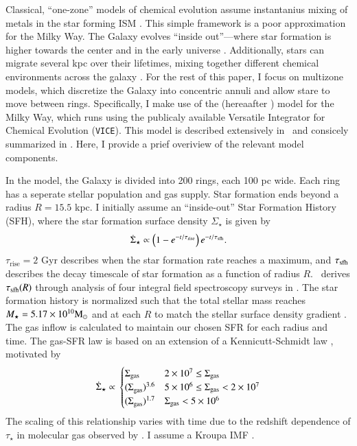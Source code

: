 \documentclass[12pt,oneside]{report}
\newcommand{\JJ}{\citetalias{james+21}}
\newcommand{\VICE}{\texttt{VICE}}
\begin{document}
Classical, ``one-zone'' models of chemical evolution assume instantanius mixing of metals in the star forming ISM \citep[e.g.][]{matteucci21}. This simple framework is a poor approximation for the Milky Way.  The Galaxy evolves ``inside out''---where star formation is higher towards the center and in the early universe \citep{bird+13}. Additionally, stars can migrate several kpc over their lifetimes, mixing together different chemical environments across the galaxy \citep{bird+12,sellwood+binney02}. For the rest of this paper, I focus on multizone models, which discretize the Galaxy into concentric annuli and allow stare to move between rings.  Specifically, I make use of the \citet{james+21} (hereaafter \JJ) model for the Milky Way, which runs using the publicaly available Versatile Integrator for Chemical Evolution (\VICE). This model is described extensively in \JJ~and consicely summarized  in \citet{james+22}. Here, I provide a prief overiview of the relevant model components.

In the model, the Galaxy is divided into 200 rings, each 100 pc wide. Each ring has a seperate stellar population and gas supply. Star formation ends beyond a radius $R=15.5$ kpc. I initially assume an ``inside-out'' Star Formation History (SFH), where the star formation surface density $\Sigma_\star$ is given by 
\begin{equation}
    \dot{\Sigma}_\star \propto \left(1-e^{-t/\tau_{\rm rise}}\right) e^{-t/\tau_{\rm sfh}}.
\end{equation}
$\tau_\text{rise}=2$ Gyr describes when the star formation rate reaches a maximum, and $\tau_{\rm sfh}$ describes the decay timescale of star formation as a function of radius $R$. \JJ~derives $\tau_{\rm sfh}(R)$ through analysis of four integral field spectroscopy surveys in \cite{sanches20}. The star formation history is normalized such that the total stellar mass reaches $M_\star=5.17\times10^{10} {\rm M}_\odot$ \citep{LM15} and at each $R$ to match the stellar surface density gradient \citep{BHG16}.
The gas inflow is calculated to maintain our chosen SFR for each radius and time. The gas-SFR law is based on an extension of a Kennicutt-Schmidt law \citep{kennicutt98}, motivated by 
\begin{equation}
\dot{\Sigma}_{\star} \propto \\
\begin{cases}
    {\Sigma}_{\rm gas} & 2\times 10^7 \leq \Sigma_{\rm gas} \\ 
    {(\Sigma}_{\rm gas})^{3.6} & 5\times 10^6 \leq \Sigma_{\rm gas} < 2\times10^7 \\ 
    {(\Sigma}_{\rm gas})^{1.7} & \Sigma_{\rm gas} < 5\times10^6 \\ 
\end{cases}
\end{equation}
The scaling of this relationship varies with time due to the redshift dependence of $\tau_\star$ in molecular gas observed by \citet{tacconi18}. I assume a Kroupa IMF \cite{kroupa01}.
\end{document}
